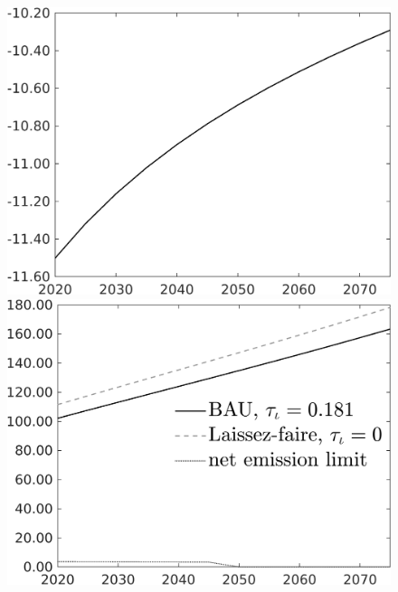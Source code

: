 \begin{figure}[h!!]
\begin{minipage}[]{0.32\textwidth}
	\end{minipage}	
	\begin{minipage}[]{0.32\textwidth}
		\includegraphics[width=1\textwidth]{../../codding_model/own_basedOnFried/optimalPol_010922_revision/figures/all_13Sept22/CompTaul_Equlab_LFBAUPer_Reg0_C_spillover0_nsk1_xgr1_knspil1_sep1_countec0_GovRev1_etaa0.79.png}
	\end{minipage}	
	\begin{minipage}[]{0.32\textwidth}
		\includegraphics[width=1\textwidth]{../../codding_model/own_basedOnFried/optimalPol_010922_revision/figures/all_13Sept22/CompTaul_Equlab_LFBAU_Reg0_Emnet_spillover0_nsk1_xgr1_knspil1_sep1_countec0_GovRev1_etaa0.79_lgd1.png}

\end{minipage}
\end{figure}
